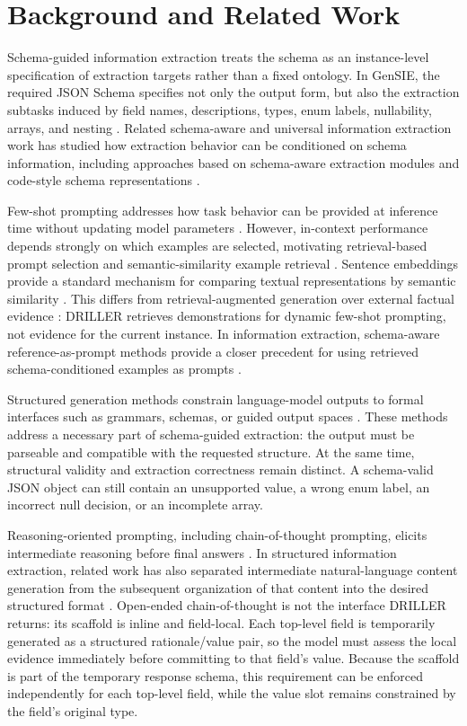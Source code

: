 \section{Background and Related Work}

Schema-guided information extraction treats the schema as an instance-level specification of extraction targets rather than a fixed ontology. In GenSIE, the required JSON Schema specifies not only the output form, but also the extraction subtasks induced by field names, descriptions, types, enum labels, nullability, arrays, and nesting \cite{gensie2026overview}. Related schema-aware and universal information extraction work has studied how extraction behavior can be conditioned on schema information, including approaches based on schema-aware extraction modules and code-style schema representations \cite{wen2025effectiveefficientschemaawareinformation,li2024knowcoder}.

Few-shot prompting addresses how task behavior can be provided at inference time without updating model parameters \cite{brown2020language}. However, in-context performance depends strongly on which examples are selected, motivating retrieval-based prompt selection and semantic-similarity example retrieval \cite{liu2022what,rubin2022learning}. Sentence embeddings provide a standard mechanism for comparing textual representations by semantic similarity \cite{reimers2019sentence}. This differs from retrieval-augmented generation over external factual evidence \cite{lewis2020retrieval}: DRILLER retrieves demonstrations for dynamic few-shot prompting, not evidence for the current instance. In information extraction, schema-aware reference-as-prompt methods provide a closer precedent for using retrieved schema-conditioned examples as prompts \cite{yao2023schema}.

Structured generation methods constrain language-model outputs to formal interfaces such as grammars, schemas, or guided output spaces \cite{geng2023grammar,geng2025structured}. These methods address a necessary part of schema-guided extraction: the output must be parseable and compatible with the requested structure. At the same time, structural validity and extraction correctness remain distinct. A schema-valid JSON object can still contain an unsupported value, a wrong enum label, an incorrect null decision, or an incomplete array.

Reasoning-oriented prompting, including chain-of-thought prompting, elicits intermediate reasoning before final answers \cite{wei2022chain}. In structured information extraction, related work has also separated intermediate natural-language content generation from the subsequent organization of that content into the desired structured format \cite{li2024simple}. Open-ended chain-of-thought is not the interface DRILLER returns: its scaffold is inline and field-local. Each top-level field is temporarily generated as a structured rationale/value pair, so the model must assess the local evidence immediately before committing to that field's value. Because the scaffold is part of the temporary response schema, this requirement can be enforced independently for each top-level field, while the value slot remains constrained by the field's original type.

